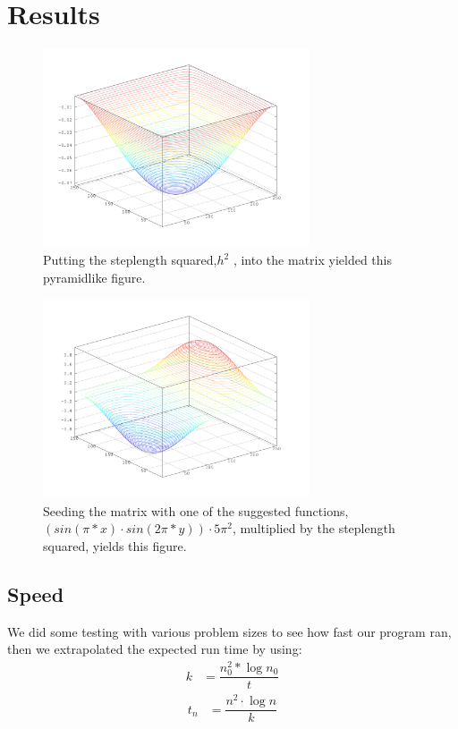 \newpage
\section{Results}
\begin{figure}[H]
  \centering
    \includegraphics[width=0.7\textwidth]{datashit512flat_v2.png}
    \caption{Putting the steplength squared,$h^2$ ,  into the matrix yielded this pyramidlike figure.  }
\end{figure}
\FloatBarrier
\begin{figure}[H]
  \centering
    \includegraphics[width=0.7\textwidth]{datashit512sinpixsin2pix_v2.png}
    \caption{ Seeding the matrix with one of the suggested functions, $(sin(\pi*x)\cdot sin(2\pi*y))\cdot 5\pi^2$, multiplied by the steplength squared, yields this figure. }
\end{figure}
\FloatBarrier

\subsection{Speed}
We did some testing with various problem sizes to see how fast our program ran, then we
extrapolated the expected run time by using:
\begin{align}
k &= 
    \dfrac{n_{0}^2*\log{n_{0}}}{t}
\end{align}
\begin{align}    
t_{n} &= \dfrac
        {n^2\cdot\log{n}}
        {k} 
\end{align}

